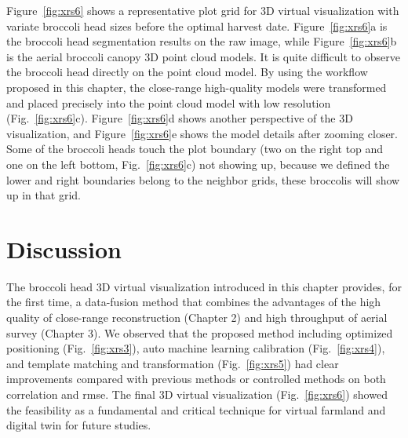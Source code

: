 Figure~\ref{fig:xrs6} shows a representative plot grid for 3D virtual visualization with variate broccoli head sizes before the optimal harvest date. Figure~\ref{fig:xrs6}a is the broccoli head segmentation results on the raw image, while Figure~\ref{fig:xrs6}b is the aerial broccoli canopy 3D point cloud models. It is quite difficult to observe the broccoli head directly on the point cloud model. By using the workflow proposed in this chapter, the close-range high-quality models were transformed and placed precisely into the point cloud model with low resolution (Fig.~\ref{fig:xrs6}c). Figure~\ref{fig:xrs6}d shows another perspective of the 3D visualization, and Figure~\ref{fig:xrs6}e shows the model details after zooming closer. Some of the broccoli heads touch the plot boundary (two on the right top and one on the left bottom, Fig.~\ref{fig:xrs6}c) not showing up, because we defined the lower and right boundaries belong to the neighbor grids, these broccolis will show up in that grid.



\section{Discussion}

The broccoli head 3D virtual visualization introduced in this chapter provides, for the first time, a data-fusion method that combines the advantages of the high quality of close-range reconstruction (Chapter 2) and high throughput of aerial survey (Chapter 3). We observed that the proposed method including optimized positioning (Fig.~\ref{fig:xrs3}), auto machine learning calibration (Fig.~\ref{fig:xrs4}), and template matching and transformation (Fig.~\ref{fig:xrs5}) had clear improvements compared with previous methods or controlled methods on both correlation and \gls{rmse}. The final 3D virtual visualization (Fig.~\ref{fig:xrs6}) showed the feasibility as a fundamental and critical technique for virtual farmland and digital twin for future studies.


